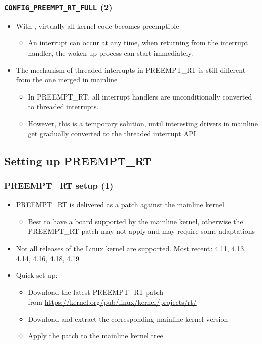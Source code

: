 \begin{frame}
  \frametitle{{\tt CONFIG\_PREEMPT\_RT\_FULL} (2)}
  \begin{itemize}
  \item With , virtually all kernel code
    becomes preemptible
    \begin{itemize}
    \item An interrupt can occur at any time, when returning from the
      interrupt handler, the woken up process can start immediately.
    \end{itemize}
  \item The mechanism of threaded interrupts in PREEMPT\_RT is still
    different from the one merged in mainline
    \begin{itemize}
      \item In PREEMPT\_RT, all interrupt handlers are unconditionally
        converted to threaded interrupts.
      \item However, this is a temporary solution, until interesting drivers in
    	mainline get gradually converted to the threaded interrupt API.
    \end{itemize}
  \end{itemize}
\end{frame}

\subsection{Setting up PREEMPT\_RT}

\begin{frame}
  \frametitle{PREEMPT\_RT setup (1)}
  \begin{itemize}
  \item PREEMPT\_RT is delivered as a patch against the mainline
    kernel
    \begin{itemize}
    \item Best to have a board supported by the mainline kernel,
      otherwise the PREEMPT\_RT patch may not apply and may require
      some adaptations
    \end{itemize}
  \item Not all releases of the Linux kernel are supported.
      Most recent: 4.11, 4.13, 4.14, 4.16, 4.18, 4.19
  \item Quick set up:
    \begin{itemize}
    \item Download the latest PREEMPT\_RT patch\\
      from \footnotesize \url{https://kernel.org/pub/linux/kernel/projects/rt/} \normalsize
    \item Download and extract the corresponding mainline kernel
      version
    \item Apply the patch to the mainline kernel tree
    \end{itemize}
  \end{itemize}
\end{frame}

